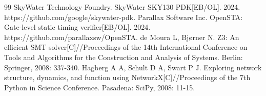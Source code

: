 \documentclass[twocolumn,10pt,fontset=windows]{ctexart}
\begin{document}
\begin{thebibliography}{99}
 SkyWater Technology Foundry. SkyWater SKY130 PDK[EB/OL]. 2024. https://github.com/google/skywater-pdk.
 Parallax Software Inc. OpenSTA: Gate-level static timing verifier[EB/OL]. 2024. https://github.com/parallaxsw/OpenSTA.
 de Moura L, Bjørner N. Z3: An efficient SMT solver[C]//Proceedings of the 14th International Conference on Tools and Algorithms for the Construction and Analysis of Systems. Berlin: Springer, 2008: 337-340.
 Hagberg A A, Schult D A, Swart P J. Exploring network structure, dynamics, and function using NetworkX[C]//Proceedings of the 7th Python in Science Conference. Pasadena: SciPy, 2008: 11-15.
\end{thebibliography}
\end{document}
